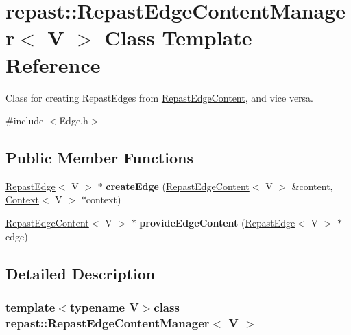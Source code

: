 \hypertarget{classrepast_1_1_repast_edge_content_manager}{\section{repast\-:\-:Repast\-Edge\-Content\-Manager$<$ V $>$ Class Template Reference}
\label{classrepast_1_1_repast_edge_content_manager}
}


Class for creating Repast\-Edges from \hyperlink{structrepast_1_1_repast_edge_content}{Repast\-Edge\-Content}, and vice versa.  




{\ttfamily \#include $<$Edge.\-h$>$}

\subsection*{Public Member Functions}
\begin{DoxyCompactItemize}
\item 
\hypertarget{classrepast_1_1_repast_edge_content_manager_a13d9f23ad211f3c9bebf7992cd72b948}{\hyperlink{classrepast_1_1_repast_edge}{Repast\-Edge}$<$ V $>$ $\ast$ {\bfseries create\-Edge} (\hyperlink{structrepast_1_1_repast_edge_content}{Repast\-Edge\-Content}$<$ V $>$ \&content, \hyperlink{classrepast_1_1_context}{Context}$<$ V $>$ $\ast$context)}\label{classrepast_1_1_repast_edge_content_manager_a13d9f23ad211f3c9bebf7992cd72b948}

\item 
\hypertarget{classrepast_1_1_repast_edge_content_manager_abf4f43f36532b640ad1d6bee1ea39307}{\hyperlink{structrepast_1_1_repast_edge_content}{Repast\-Edge\-Content}$<$ V $>$ $\ast$ {\bfseries provide\-Edge\-Content} (\hyperlink{classrepast_1_1_repast_edge}{Repast\-Edge}$<$ V $>$ $\ast$edge)}\label{classrepast_1_1_repast_edge_content_manager_abf4f43f36532b640ad1d6bee1ea39307}

\end{DoxyCompactItemize}


\subsection{Detailed Description}
\subsubsection*{template$<$typename V$>$class repast\-::\-Repast\-Edge\-Content\-Manager$<$ V $>$}

